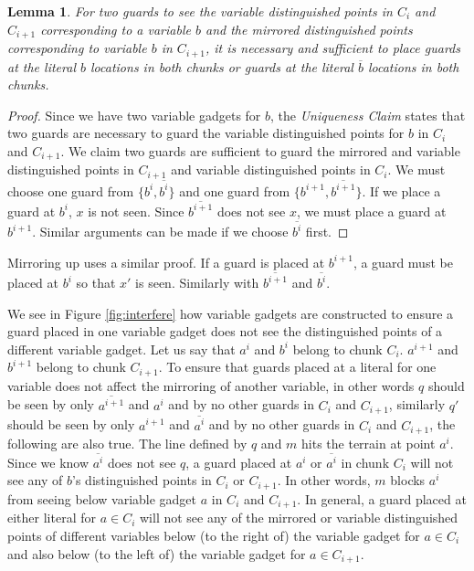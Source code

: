\documentclass[11pt]{article}
\newtheorem{lemma}[theorem]{Lemma}
\begin{document}
\begin{lemma}\label{lemmaMirrorUp} For two guards to see the variable distinguished points in $C_i$ and $C_{i+1}$ corresponding to a variable $b$ and the mirrored distinguished points corresponding to variable $b$ in $C_{i+1}$, it is necessary and sufficient to place guards at the literal $b$ locations in both chunks or guards at the literal $\overline{b}$ locations in both chunks. 
\end{lemma}

\begin{proof}
Since we have two variable gadgets for $b$, the {\em Uniqueness Claim} states that two guards are necessary to guard the variable distinguished points for $b$ in $C_i$ and $C_{i+1}$.  We claim two guards are sufficient to guard the mirrored and variable distinguished points in $C_{i+1}$ and variable distinguished points in $C_i$.  We must choose one guard from $\{b^i, \overline{b^i}\}$ and one guard from $\{b^{i+1}, \overline{b^{i+1}}\}$.  If we place a guard at $b^i$, $x$ is not seen.  
Since $\overline{b^{i+1}}$ does not see $x$, we must place a guard at $b^{i+1}$.  Similar arguments can be made if we choose $\overline{b^i}$ first.
\end{proof}

Mirroring up uses a similar proof.  If a guard is placed at $b^{i+1}$, a guard must be placed at $b^i$ so that $x'$ is seen.  Similarly with $\overline{b^{i+1}}$ and $\overline{b^i}$.  

We see in Figure \ref{fig:interfere} how variable gadgets are constructed to ensure a guard placed in one variable gadget does not see the distinguished points of a different variable gadget.  Let us say that $a^i$ and $b^i$ belong to chunk $C_i$.  $a^{i+1}$ and $b^{i+1}$ belong to chunk $C_{i+1}$.  To ensure that guards placed at a literal for one variable does not affect the mirroring of another variable, in other words $q$ should be seen by only $\overline{a^{i+1}}$ and $a^i$ and by no other guards in $C_i$ and $C_{i+1}$, similarly $q'$ should be seen by only $a^{i+1}$ and $\overline{a^i}$ and by no other guards in $C_i$ and $C_{i+1}$, the following are also true.  The line defined by $q$ and $m$ hits the terrain at point $a^i$.  Since we know $\overline{a^i}$ does not see $q$, a guard placed at $a^i$ or $\overline{a^i}$ in chunk $C_i$ will not see any of $b$'s distinguished points in $C_i$ or $C_{i+1}$.  In other words, $m$ blocks $a^i$ from seeing below variable gadget $a$ in $C_i$ and $C_{i+1}$.  In general, a guard placed at either literal for $a \in C_i$ will not see any of the mirrored or variable distinguished points of different variables below (to the right of) the variable gadget for $a \in C_i$ and also below (to the left of) the variable gadget for $a \in C_{i+1}$.
\end{document}
